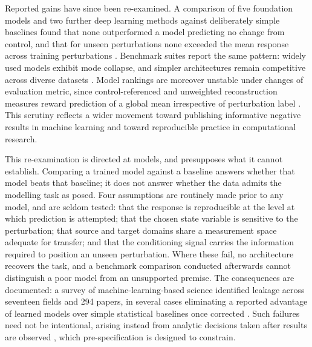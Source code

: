 \documentclass[5p,times,twocolumn]{elsarticle}
\begin{document}
Reported gains have since been re-examined. A comparison of five foundation
models and two further deep learning methods against deliberately simple
baselines found that none outperformed a model predicting no change from
control, and that for unseen perturbations none exceeded the mean response
across training perturbations \cite{ahlmann2025deep}. Benchmark suites
report the same pattern: widely used models exhibit mode collapse, and simpler
architectures remain competitive across diverse datasets
\cite{wu2026perturbench, radig2026scarchon}. Model rankings are moreover unstable
under changes of evaluation metric, since control-referenced and unweighted
reconstruction measures reward prediction of a global mean irrespective of
perturbation label \cite{mejia2025diversity}. This scrutiny reflects a wider
movement toward publishing informative negative results in machine learning
\cite{karl2024position, curry2025ending} and toward reproducible practice in
computational research\cite{kapoor2023leakage}.

This re-examination is directed at models, and presupposes what it cannot
establish. Comparing a trained model against a baseline answers whether that
model beats that baseline; it does not answer whether the data admits the
modelling task as posed. Four assumptions are routinely made prior to any
model, and are seldom tested: that the response is reproducible at the level at
which prediction is attempted; that the chosen state variable is sensitive to
the perturbation; that source and target domains share a measurement space
adequate for transfer; and that the conditioning signal carries the information
required to position an unseen perturbation. Where these fail, no architecture
recovers the task, and a benchmark comparison conducted afterwards cannot
distinguish a poor model from an unsupported premise. The consequences are
documented: a survey of machine-learning-based science identified leakage
across seventeen fields and 294 papers, in several cases eliminating a reported
advantage of learned models over simple statistical baselines once corrected
\cite{kapoor2023leakage}. Such failures need not be intentional, arising
instead from analytic decisions taken after results are observed
\cite{hullman2022worst, simmons2011false}, which pre-specification is designed
to constrain.
\end{document}
